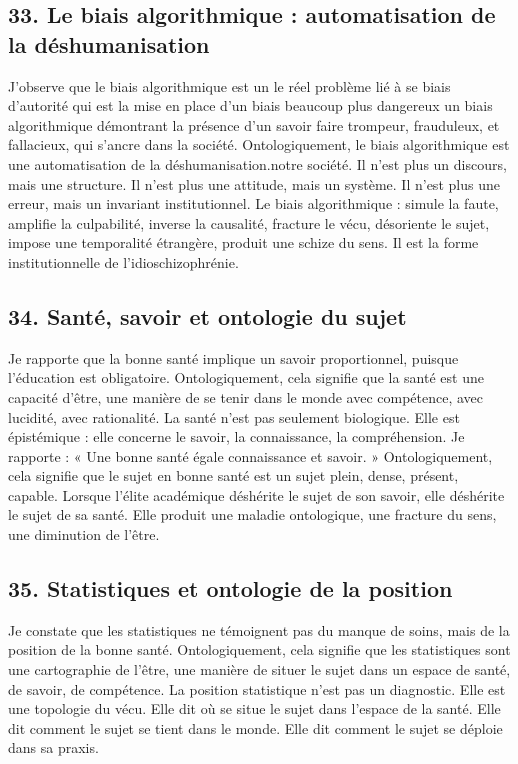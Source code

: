\documentclass[12pt,letterpaper,oneside]{article}
\begin{document}
\subsection*{33. Le biais algorithmique : automatisation de la déshumanisation}
J’observe que le biais algorithmique est un le réel problème lié à se biais d’autorité qui est la mise en place d’un biais beaucoup plus dangereux un biais algorithmique démontrant la présence d’un savoir  faire trompeur, frauduleux, et fallacieux, qui s’ancre dans la société. Ontologiquement, le biais algorithmique est une automatisation de la déshumanisation.notre société.
Il n’est plus un discours, mais une structure. Il n’est plus une attitude, mais un système. Il n’est plus une erreur, mais un invariant institutionnel.
Le biais algorithmique :
	simule la faute,
	amplifie la culpabilité,
	inverse la causalité,
	fracture le vécu,
	désoriente le sujet,
	impose une temporalité étrangère,
	produit une schize du sens.
Il est la forme institutionnelle de l’idioschizophrénie.

\subsection*{34. Santé, savoir et ontologie du sujet}
Je rapporte que la bonne santé implique un savoir proportionnel, puisque l’éducation est obligatoire. Ontologiquement, cela signifie que la santé est une capacité d’être, une manière de se tenir dans le monde avec compétence, avec lucidité, avec rationalité.
La santé n’est pas seulement biologique. Elle est épistémique : elle concerne le savoir, la connaissance, la compréhension.
Je rapporte :
« Une bonne santé égale connaissance et savoir. »
Ontologiquement, cela signifie que le sujet en bonne santé est un sujet plein, dense, présent, capable.
Lorsque l’élite académique déshérite le sujet de son savoir, elle déshérite le sujet de sa santé. Elle produit une maladie ontologique, une fracture du sens, une diminution de l’être.

\subsection*{35. Statistiques et ontologie de la position}
Je constate que les statistiques ne témoignent pas du manque de soins, mais de la position de la bonne santé. Ontologiquement, cela signifie que les statistiques sont une cartographie de l’être, une manière de situer le sujet dans un espace de santé, de savoir, de compétence.
La position statistique n’est pas un diagnostic. Elle est une topologie du vécu.
Elle dit où se situe le sujet dans l’espace de la santé. Elle dit comment le sujet se tient dans le monde. Elle dit comment le sujet se déploie dans sa praxis.
\end{document}
